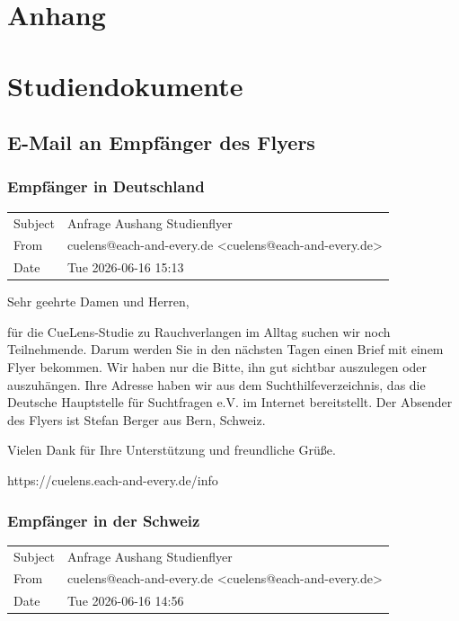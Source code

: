 \chapter*{Anhang}
\chapter{Studiendokumente}
\label{studiendokumente}
\section{E-Mail an Empfänger des Flyers}
\subsection{Empfänger in Deutschland}
\begin{tabularx}{\textwidth} {
 >{\raggedright\arraybackslash}p{1cm}
 >{\raggedright\arraybackslash}X
}
Subject & Anfrage Aushang Studienflyer \\
From & cuelens@each-and-every.de <cuelens@each-and-every.de> \\
Date & Tue 2026-06-16 15:13 \\
\end{tabularx}

\vspace{1em}

Sehr geehrte Damen und Herren,

für die CueLens-Studie zu Rauchverlangen im Alltag suchen wir noch Teilnehmende. Darum werden
Sie in den nächsten Tagen einen Brief mit einem Flyer bekommen. Wir haben nur die Bitte, ihn gut
sichtbar auszulegen oder auszuhängen. Ihre Adresse haben wir aus dem Suchthilfeverzeichnis, das die
Deutsche Hauptstelle für Suchtfragen e.V. im Internet bereitstellt. Der Absender des Flyers ist Stefan
Berger aus Bern, Schweiz.

Vielen Dank für Ihre Unterstützung und freundliche Grüße.

https://cuelens.each-and-every.de/info

\subsection{Empfänger in der Schweiz}
\begin{tabularx}{\textwidth} {
 >{\raggedright\arraybackslash}p{1cm}
 >{\raggedright\arraybackslash}X
}
Subject & Anfrage Aushang Studienflyer \\
From & cuelens@each-and-every.de <cuelens@each-and-every.de> \\
Date & Tue 2026-06-16 14:56 \\
\end{tabularx}

